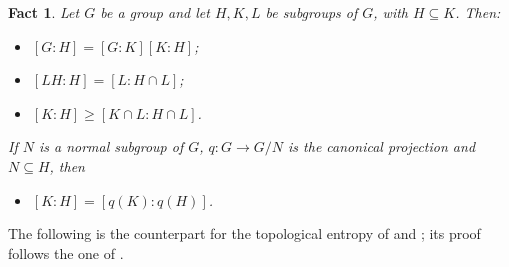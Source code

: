 \documentclass[11pt]{article}
\newtheorem{fact}[theorem]{Fact}
\theoremstyle{definition}
\numberwithin{equation}{section}
\begin{document}
\begin{fact}\label{gi}
Let $G$ be a group and let $H,K,L$ be subgroups of $G$, with $H\subseteq K$. Then:
\begin{itemize}
\item[(a)] $[G:H]=[G:K][K:H]$;
\item[(b)] $[LH:H]=[L:H\cap L]$;
\item[(c)] $[K:H]\geq[K\cap L:H\cap L]$.
\end{itemize}
If $N$ is a normal subgroup of $G$, $q:G\to G/N$ is the canonical projection and $N\subseteq H$, then
\begin{itemize}
\item[(d)] $[K:H]=[q(K):q(H)]$.
\end{itemize}
\end{fact}

The following is the counterpart for the topological entropy of \cite[Lemma 1.1]{DGSZ} and \cite[Lemma 2.2]{DGS}; its proof follows the one of \cite[Lemma 3.1]{DG-limitfree}. %
\end{document}
